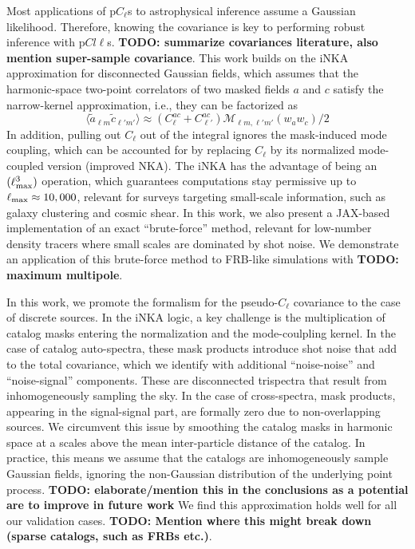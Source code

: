 \documentclass[aps,twocolumn, superscriptaddress, english, nofootinbib, 10pt]{revtex4-2}
\newcommand{\todo}[1]{{\color{blue}\bf TODO: #1}}
\begin{document}
    Most applications of p$C_\ell$s to astrophysical inference assume a Gaussian likelihood. Therefore, knowing the covariance is key to performing robust inference with p$Cl\ell$s. \todo{summarize covariances literature, also mention super-sample covariance}. This work builds on the iNKA approximation for disconnected Gaussian fields, which assumes that the harmonic-space two-point correlators of two masked fields $a$ and $c$ satisfy the narrow-kernel approximation, i.e., they can be factorized as
    \begin{equation*}
        \langle \tilde{a}_{\ell m} \tilde{c}_{\ell' m'} \rangle \approx (C_\ell^{ac} + C_{\ell'}^{ac})\mathcal{M}_{\ell m,\ell' m'}(w_aw_c)/2
    \end{equation*}
    In addition, pulling out $C_\ell$ out of the integral ignores the mask-induced mode coupling, which can be accounted for by replacing $C_\ell$ by its normalized mode-coupled version (improved NKA). The iNKA has the advantage of being an $\mathcal(\ell_{\rm max}^3)$ operation, which guarantees computations stay permissive up to $\ell_{\rm max}\approx 10,000$, relevant for surveys targeting small-scale information, such as galaxy clustering and cosmic shear. In this work, we also present a JAX-based implementation of an exact ``brute-force'' method, relevant for low-number density tracers where small scales are dominated by shot noise. We demonstrate an application of this brute-force method to FRB-like simulations with \todo{maximum multipole}.

    In this work, we promote the formalism for the pseudo-$C_\ell$ covariance to the case of discrete sources. In the iNKA logic, a key challenge is the multiplication of catalog masks entering the normalization and the mode-coulpling kernel. In the case of catalog auto-spectra, these mask products introduce shot noise that add to the total covariance, which we identify with additional ``noise-noise'' and ``noise-signal'' components. These are disconnected trispectra that result from inhomogeneously sampling the sky. In the case of cross-spectra, mask products, appearing in the signal-signal part, are formally zero due to non-overlapping sources. We circumvent this issue by smoothing the catalog masks in harmonic space at a scales above the mean inter-particle distance of the catalog. In practice, this means we assume that the catalogs are inhomogeneously sample Gaussian fields, ignoring the non-Gaussian distribution of the underlying point process. \todo{elaborate/mention this in the conclusions as a potential are to improve in future work} We find this approximation holds well for all our validation cases. \todo{Mention where this might break down (sparse catalogs, such as FRBs etc.)}.
\end{document}
